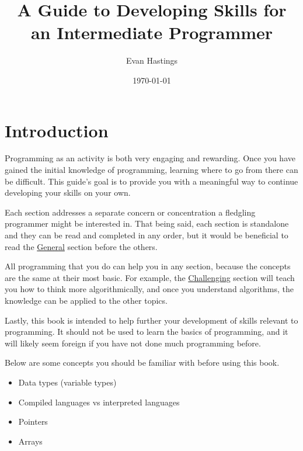 \documentclass[12pt, oneside, a4paper]{book}
\title{A Guide to Developing Skills for an Intermediate Programmer}
\date{\today}
\author{Evan Hastings}
\begin{document}
   \maketitle
   \newpage
   \tableofcontents
   \newpage
   \chapter{Introduction}
      Programming as an activity is both very engaging and rewarding.
      Once you have gained the initial knowledge of programming, learning where to go from there can be difficult.
      This guide's goal is to provide you with a meaningful way to continue developing your skills on your own.

      Each section addresses a separate concern or concentration a fledgling programmer might be interested in.
      That being said, each section is standalone and they can be read and completed in any order, but it would be beneficial to read the \hyperref[chap:general]{General} section before the others.

      All programming that you do can help you in any section, because the concepts are the same at their most basic.
      For example, the \hyperref[chap:challenge]{Challenging} section will teach you how to think more algorithmically, and once you understand algorithms, the knowledge can be applied to the other topics.

      Lastly, this book is intended to help further your development of skills relevant to programming.
      It should not be used to learn the basics of programming, and it will likely seem foreign if you have not done much programming before.

      Below are some concepts you should be familiar with before using this book\footnotemark.

      \begin{itemize}
         \item Data types (variable types)
         \item Compiled languages vs interpreted languages
         \item Pointers
         \item Arrays
      \end{itemize}
\end{document}
